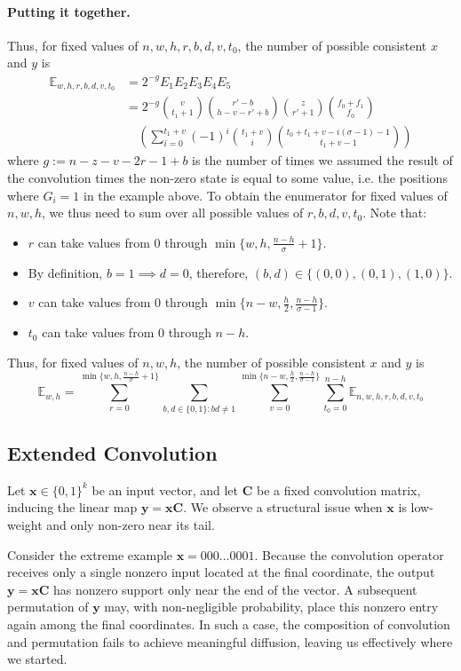 \paragraph{Putting it together.}
Thus, for fixed values of $n,w,h,r,b,d,v,t_0$, the number of possible consistent $x$ and $y$ is
\begin{align*}
  \mathbb{E}_{w,h,r,b,d,v,t_0} &= 2^{-g}E_1E_2E_3E_4E_5\\
  &=2^{-g}\binom{v}{t_1+1} \binom{r'-b}{h-v-r'+b} \binom{z}{r'+1} \binom{f_0+f_1}{f_0} \\
  &\quad \left(\sum_{i=0}^{t_1+v}(-1)^{i}\binom{t_1+v}{i}\binom{t_0+t_1+v-i(\sigma-1)-1}{t_1+v-1}\right)
\end{align*}
where $g:=n-z-v-2r-1+b$ is the number of times we assumed the result of the convolution times the non-zero state is equal to some value, i.e. the positions where $G_i=1$ in the example above.
To obtain the enumerator for fixed values of $n,w,h$, we thus need to sum over all possible values of $r,b,d,v,t_0$. Note that:
\begin{itemize}
  \item $r$ can take values from $0$ through $\min\{w,h,\frac{n-h}{\sigma}+1\}$.
  \item By definition, $b=1\implies d=0$, therefore, $(b, d) \in \{(0,0), (0,1), (1,0)\}$.
  \item $v$ can take values from $0$ through $\min\{n-w,\frac{h}{2},\frac{n-h}{\sigma-1}\}$.
  \item $t_0$ can take values from $0$ through $n-h$.
\end{itemize}
Thus, for fixed values of $n,w,h$, the number of possible consistent $x$ and $y$ is$$\mathbb{E}_{w,h} = \sum_{r=0}^{\min\{w,h,\frac{n-h}{\sigma}+1\}}\sum_{b, d\in \{0, 1\}:bd\ne 1}\sum_{v=0}^{\min\{n-w,\frac{h}{2},\frac{n-h}{\sigma-1}\}}\sum_{t_0=0}^{n-h}\mathbb{E}_{n,w,h,r,b,d,v,t_0}$$

\subsection{Extended Convolution}\label{sec:extendedconv}

Let $\mathbf{x} \in \{0,1\}^k$ be an input vector, and let $\mathbf{C}$ be a fixed convolution matrix, inducing the linear map $\mathbf{y} = \mathbf{x}\mathbf{C}$.
We observe a structural issue when $\mathbf{x}$ is low-weight and only non-zero near its tail.

Consider the extreme example $\mathbf{x} = 000\ldots0001$.
Because the convolution operator receives only a single nonzero input located at the final coordinate, the output $\mathbf{y} = \mathbf{x}\mathbf{C}$ has nonzero support only near the end of the vector.  A subsequent permutation of $\mathbf{y}$ may, with non-negligible probability, place this nonzero entry again among the final coordinates.  In such a case, the composition of convolution and permutation fails to achieve meaningful diffusion, leaving us effectively where we started.

